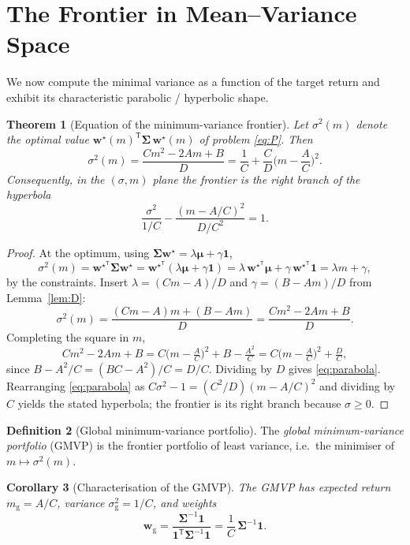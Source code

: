 \documentclass[11pt]{article}
\theoremstyle{definition}
\newtheorem{definition}{Definition}[section]
\theoremstyle{plain}
\newtheorem{theorem}[definition]{Theorem}
\newtheorem{corollary}[definition]{Corollary}
\newcommand{\one}{\mathbf{1}}
\newcommand{\bw}{\bm{w}}
\newcommand{\bmu}{\bm{\mu}}
\newcommand{\bSigma}{\bm{\Sigma}}
\newcommand{\T}{^{\mathsf{T}}}
\begin{document}
\section{The Frontier in Mean--Variance Space}

We now compute the minimal variance as a function of the target return and
exhibit its characteristic parabolic / hyperbolic shape.

\begin{theorem}[Equation of the minimum-variance frontier]\label{thm:parabola}
Let $\sigma^2(m)$ denote the optimal value $\bw^\star(m)\T \bSigma\, \bw^\star(m)$
of problem \eqref{eq:P}. Then
\begin{equation}\label{eq:parabola}
\sigma^2(m) = \frac{C m^2 - 2 A m + B}{D}
= \frac{1}{C} + \frac{C}{D}\Big(m - \frac{A}{C}\Big)^2 .
\end{equation}
Consequently, in the $(\sigma, m)$ plane the frontier is the right branch of the
hyperbola
\[
\frac{\sigma^2}{1/C} - \frac{(m - A/C)^2}{D/C^2} = 1 .
\]
\end{theorem}

\begin{proof}
At the optimum, using $\bSigma \bw^\star = \lambda\bmu + \gamma\one$,
\[
\sigma^2(m) = \bw^{\star\T}\bSigma\bw^\star
= \bw^{\star\T}(\lambda\bmu + \gamma\one)
= \lambda \, \bw^{\star\T}\bmu + \gamma\, \bw^{\star\T}\one
= \lambda m + \gamma,
\]
by the constraints. Insert $\lambda = (Cm - A)/D$ and $\gamma = (B - Am)/D$
from Lemma~\ref{lem:D}:
\[
\sigma^2(m) = \frac{(Cm-A)m + (B - Am)}{D}
= \frac{Cm^2 - 2Am + B}{D}.
\]
Completing the square in $m$,
\[
Cm^2 - 2Am + B = C\Big(m - \tfrac{A}{C}\Big)^2 + B - \tfrac{A^2}{C}
= C\Big(m - \tfrac{A}{C}\Big)^2 + \tfrac{D}{C},
\]
since $B - A^2/C = (BC - A^2)/C = D/C$. Dividing by $D$ gives
\eqref{eq:parabola}. Rearranging \eqref{eq:parabola} as
$C\sigma^2 - 1 = (C^2/D)(m - A/C)^2$ and dividing by $C$ yields the stated
hyperbola; the frontier is its right branch because $\sigma \ge 0$.
\end{proof}

\begin{definition}[Global minimum-variance portfolio]
The \emph{global minimum-variance portfolio} (GMVP) is the frontier portfolio of
least variance, i.e.\ the minimiser of $m \mapsto \sigma^2(m)$.
\end{definition}

\begin{corollary}[Characterisation of the GMVP]\label{cor:gmvp}
The GMVP has expected return $m_{\mathrm{g}} = A/C$, variance
$\sigma_{\mathrm{g}}^2 = 1/C$, and weights
\[
\bw_{\mathrm{g}} = \frac{\bSigma^{-1}\one}{\one\T \bSigma^{-1}\one}
= \frac{1}{C}\,\bSigma^{-1}\one .
\]
\end{corollary}
\end{document}
